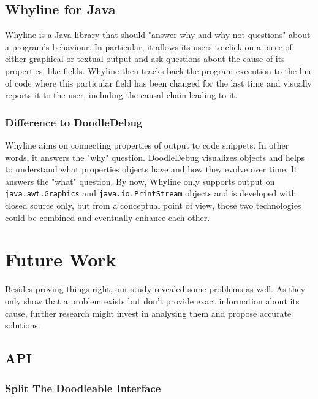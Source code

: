 \documentclass[english]{acm_proc_article-sp}
\newcommand{\nb}[2]{\nbc{#1}{#2}{orange}}
\newcommand\todo[1]{\nb{TO DO}{#1}}
\begin{document}
\subsection{Whyline for Java}
Whyline\cite{whyline-website} is a Java library that should "answer why and why not questions"\cite{whyline-paper} about a program's behaviour. In particular, it allows its users to click on a piece of either graphical or textual output and ask questions about the cause of its properties, like fields. Whyline then tracks back the program execution to the line of code where this particular field has been changed for the last time and visually reports it to the user, including the causal chain leading to it.

\subsubsection{Difference to DoodleDebug}
Whyline aims on connecting properties of output to code snippets. In other words, it answers the "why" question. DoodleDebug visualizes objects and helps to understand what properties objects have and how they evolve over time. It answers the "what" question. By now, Whyline only supports output on \verb-java.awt.Graphics- and \verb-java.io.PrintStream- objects and is developed with closed source only, but from a conceptual point of view, those two technologies could be combined and eventually enhance each other.

\section{Future Work}

Besides proving things right, our study revealed some problems as well. As they only show that a problem exists but don't provide exact information about its cause, further research might invest in analysing them and propose accurate solutions.

\subsection{API}
\todo{Text}

\subsubsection{Split The Doodleable Interface}
\end{document}
